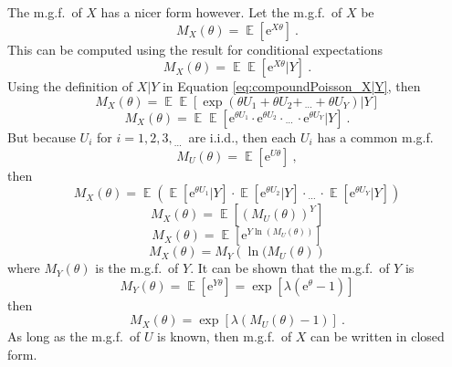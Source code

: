 \documentclass[12pt, a4paper]{memoir}
\DeclareMathOperator{\expectation}{\mathbb{E}}
\newcommand{\euler}{\mathrm{e}}
\newcommand{\dotdotdot}{_{\phantom{.}\cdots}}
\begin{document}
The m.g.f.~of $X$ has a nicer form however. Let the m.g.f.~of $X$ be
\begin{equation*}
	M_X(\theta)=\expectation\left[\euler^{X\theta}\right]
	\ .
\end{equation*}
This can be computed using the result for conditional expectations
\begin{equation*}
	M_X(\theta)=\expectation\expectation\left[\euler^{X\theta}|Y\right]
	\ .
\end{equation*}
Using the definition of $X|Y$ in Equation \eqref{eq:compoundPoisson_X|Y}, then
\begin{equation*}
	M_X(\theta)=\expectation\expectation\left[\exp\left(\theta U_1 + \theta U_2 + \dotdotdot + \theta U_Y\right)|Y\right]
\end{equation*}
\begin{equation*}
	M_X(\theta)=\expectation\expectation\left[\euler^{\theta U_1}\cdot\euler^{\theta U_2}\cdot\dotdotdot\cdot\euler^{\theta U_Y}|Y\right]
	\ .
\end{equation*}
But because $U_i$ for $i=1,2,3,\dotdotdot$ are i.i.d., then each $U_i$ has a common m.g.f.
\begin{equation*}
	M_U(\theta)=\expectation\left[\euler^{U\theta}\right]
	\ ,
\end{equation*}
then
\begin{equation*}
	M_X(\theta)=\expectation\left(
		\expectation\left[\euler^{\theta U_1}|Y\right]\cdot
		\expectation\left[\euler^{\theta U_2}|Y\right]\cdot
		\dotdotdot \cdot
		\expectation\left[\euler^{\theta U_Y}|Y\right]
	\right)
\end{equation*}
\begin{equation*}
	M_X(\theta)=\expectation\left[\left(M_U(\theta)\right)^Y\right]
\end{equation*}
\begin{equation*}
	M_X(\theta)=\expectation\left[\euler^{Y\ln(M_U(\theta))}\right]
\end{equation*}
\begin{equation*}
	M_X(\theta) = M_Y\left(\ln(M_U(\theta)\right)
\end{equation*}
where $M_Y(\theta)$ is the m.g.f.~of $Y$. It can be shown that the m.g.f.~of $Y$ is
\begin{equation}
	M_Y(\theta)=\expectation\left[\euler^{Y\theta}\right]=
	\exp
	\left[
		\lambda
		\left(
		  \euler^\theta-1
		\right)
	\right]
\end{equation}
then
\begin{equation}
	M_X(\theta)=
	\exp\left[
		\lambda
		\left(
			M_U(\theta)-1
		\right)
	\right]
	\ .
\end{equation}
As long as the m.g.f.~of $U$ is known, then m.g.f.~of $X$ can be written in closed form.
\end{document}
